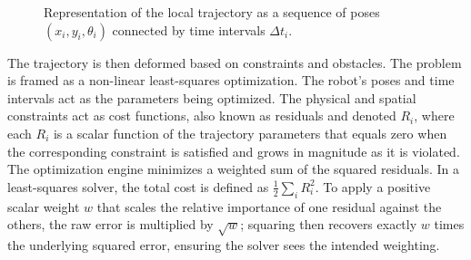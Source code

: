 \begin{figure}[htpb]
    \centering
    \caption{Representation of the local trajectory as a sequence of poses $(x_i, y_i, \theta_i)$ connected by time intervals $\Delta t_i$.}
    \label{fig:trajectory_representation}
\end{figure}

The trajectory is then deformed based on constraints and obstacles. The problem is framed as a non-linear least-squares optimization. The robot's poses and time intervals act as the parameters being optimized. The physical and spatial constraints act as cost functions, also known as residuals and denoted $R_i$, where each $R_i$ is a scalar function of the trajectory parameters that equals zero when the corresponding constraint is satisfied and grows in magnitude as it is violated. The optimization engine minimizes a weighted sum of the squared residuals. In a least-squares solver, the total cost is defined as $\frac{1}{2} \sum_i R_i^2$. 
To apply a positive scalar weight $w$ that scales the relative importance of one residual against the others,
the raw error is multiplied by $\sqrt{w}$; squaring then recovers exactly $w$ times the underlying squared error, ensuring the solver sees the intended weighting.

